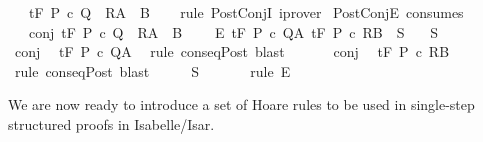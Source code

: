 \begin{isabellebody}
\ \ {\isasymLongrightarrow}\ {\isasymGamma}{\isacharcomma}{\isasymTheta}{\isasymturnstile}\isactrlsub t\isactrlbsub {\isacharslash}F\isactrlesub \ P\ c\ {\isacharparenleft}Q\ {\isasyminter}\ R{\isacharparenright}{\isacharcomma}{\isacharparenleft}A\ {\isasyminter}\ B{\isacharparenright}{\isachardoublequoteclose}\isanewline
%
\isadelimproof
\ \ %
\endisadelimproof
%
\isatagproof
{}\isamarkupfalse%
\ {\isacharparenleft}rule\ PostConjI{\isacharparenright}\ iprover{\isacharplus}%
\endisatagproof
{\isafoldproof}%
%
\isadelimproof
\isanewline
%
\endisadelimproof
\isanewline
{}\isamarkupfalse%
\ PostConjE\ {\isacharbrackleft}consumes\ {}{\isacharbrackright}{\isacharcolon}\ \isanewline
\ \ \ conj{\isacharcolon}\ {\isachardoublequoteopen}{\isasymGamma}{\isacharcomma}{\isasymTheta}{\isasymturnstile}\isactrlsub t\isactrlbsub {\isacharslash}F\isactrlesub \ P\ c\ {\isacharparenleft}Q\ {\isasyminter}\ R{\isacharparenright}{\isacharcomma}{\isacharparenleft}A\ {\isasyminter}\ B{\isacharparenright}{\isachardoublequoteclose}\ \isanewline
\ \ \ E{\isacharcolon}\ {\isachardoublequoteopen}{\isasymlbrakk}{\isasymGamma}{\isacharcomma}{\isasymTheta}{\isasymturnstile}\isactrlsub t\isactrlbsub {\isacharslash}F\isactrlesub \ P\ c\ Q{\isacharcomma}A{\isacharsemicolon}\ {\isasymGamma}{\isacharcomma}{\isasymTheta}{\isasymturnstile}\isactrlsub t\isactrlbsub {\isacharslash}F\isactrlesub \ P\ c\ R{\isacharcomma}B{\isasymrbrakk}\ {\isasymLongrightarrow}\ S{\isachardoublequoteclose}\isanewline
\ \ \ {\isachardoublequoteopen}S{\isachardoublequoteclose}\isanewline
%
\isadelimproof
%
\endisadelimproof
%
\isatagproof
{}\isamarkupfalse%
\ {\isacharminus}\isanewline
\ \ \isamarkupfalse%
\ conj\ \isamarkupfalse%
\ {\isachardoublequoteopen}{\isasymGamma}{\isacharcomma}{\isasymTheta}{\isasymturnstile}\isactrlsub t\isactrlbsub {\isacharslash}F\isactrlesub \ P\ c\ Q{\isacharcomma}A{\isachardoublequoteclose}\ \isamarkupfalse%
\ {\isacharparenleft}rule\ conseqPost{\isacharparenright}\ blast{\isacharplus}\isanewline
\ \ \isamarkupfalse%
\isanewline
\ \ \isamarkupfalse%
\ conj\ \isamarkupfalse%
\ {\isachardoublequoteopen}{\isasymGamma}{\isacharcomma}{\isasymTheta}{\isasymturnstile}\isactrlsub t\isactrlbsub {\isacharslash}F\isactrlesub \ P\ c\ R{\isacharcomma}B{\isachardoublequoteclose}\ \isamarkupfalse%
\ {\isacharparenleft}rule\ conseqPost{\isacharparenright}\ blast{\isacharplus}\isanewline
\ \ \isamarkupfalse%
\ \isamarkupfalse%
\ {\isachardoublequoteopen}S{\isachardoublequoteclose}\ \isanewline
\ \ \ \ \isamarkupfalse%
\ {\isacharparenleft}rule\ E{\isacharparenright}\isanewline
{}\isamarkupfalse%
%
\endisatagproof
{\isafoldproof}%
%
\isadelimproof
%
\endisadelimproof
%
\isamarkuptrue%
%
\begin{isamarkuptext}%
We are now ready to introduce a set of Hoare rules to be used in
 single-step structured proofs in Isabelle/Isar.  


\end{isamarkuptext}
\end{isabellebody}
